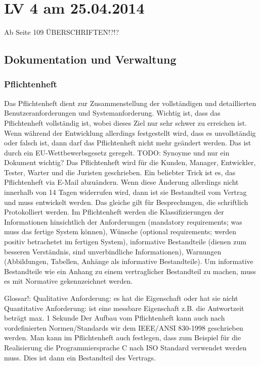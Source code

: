 \chapter{LV 4 am 25.04.2014}
Ab Seite 109
ÜBERSCHRIFTEN!?!?
\section{Dokumentation und Verwaltung}
\subsection{Pflichtenheft}
Das Pflichtenheft dient zur Zusammenstellung der vollständigen und detaillierten Benutzeranforderungen und Systemanforderung. Wichtig ist, dass das Pflichtenheft vollständig ist, wobei dieses Ziel nur sehr schwer zu erreichen ist. Wenn während der Entwicklung allerdings festgestellt wird, dass es unvollständig oder falsch ist, dann darf das Pflichtenheft nicht mehr geändert werden. Das ist durch ein EU-Wettbewerbsgesetz geregelt. 
\linebreak 
TODO: Synoyme und nur ein Dokument wichtig?
Das Pflichtenheft wird für die Kunden, Manager, Entwickler, Tester, Warter und die Juristen geschrieben.
\linebreak
Ein beliebter Trick ist es, das Pflichtenheft via E-Mail abzuändern. Wenn diese Änderung allerdings nicht innerhalb von 14 Tagen widerrufen wird, dann ist sie Bestandteil vom Vertrag und muss entwickelt werden. Das gleiche gilt für Besprechungen, die schriftlich Protokolliert werden. 
\linebreak
Im Pflichtenheft werden die Klassifizierungen der Informationen hinsichtlich der Anforderungen (mandatory requirements; was muss das fertige System können), Wünsche (optional requirements; werden positiv betrachetet im fertigen System), informative Bestandteile (dienen zum besseren Verständnis, sind unverbindliche Informationen), Warnungen (Abbildungen, Tabellen, Anhänge als informative Bestandteile). Um informative Bestandteile wie ein Anhang zu einem vertraglicher Bestandteil zu machen, muss es mit Normative gekennzeichnet werden.

Glossar!:
Qualitative Anforderung: es hat die Eigenschaft oder hat sie nicht
Quantitative Anforderung: ist eine messbare Eigenschaft z.B. die Antwortzeit beträgt max. 1 Sekunde
\linebreak
Der Aufbau vom Pflichtenheft kann auch nach vordefinierten Normen/Standards wir dem IEEE/ANSI 830-1998 geschrieben werden. 
\linebreak
Man kann im Pflichtenheft auch festlegen, dass zum Beispiel für die Realisierung die Programmiersprache C nach ISO Standard verwendet werden muss. Dies ist dann ein Bestandteil des Vertrags.




